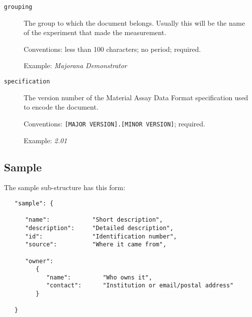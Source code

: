 \documentclass[11pt, letterpaper]{article}
\begin{document}
\begin{description}

  \item[\texttt{grouping}] The group to which the document belongs. Usually this will be the name of the experiment that made the measurement.

  Conventions: less than 100 characters; no period; required.

  Example: \textit{Majorana Demonstrator}

  \item[\texttt{specification}] The version number of the Material Assay Data Format specification used to encode the document.

  Conventions: \texttt{[MAJOR VERSION].}\texttt{[MINOR VERSION]}; required.

  Example: \textit{2.01}

\end{description}  
 
\subsection{Sample} %

The sample sub-structure has this form:

\begin{small}
\begin{verbatim}
   "sample": {

      "name":            "Short description",
      "description":     "Detailed description",     
      "id":              "Identification number",
      "source":          "Where it came from",

      "owner":
         {
            "name":         "Who owns it", 
            "contact":      "Institution or email/postal address"
         }
       
   }
\end{verbatim}
\end{small}

\newpage
\end{document}
